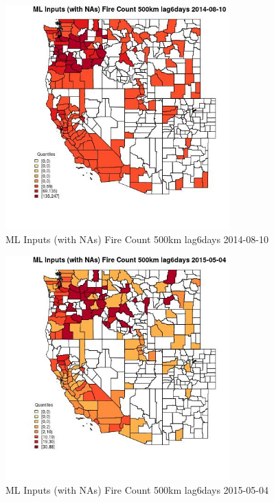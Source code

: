\begin{figure} 
\centering  
\includegraphics[width=0.77\textwidth]{Code_Outputs/Report_ML_input_PM25_Step4_part_e_de_duplicated_aves_compiled_2019-05-18wNAs_CountyFire_Count_500km_lag6daysMean2014-08-10_2014-08-10.jpg} 
\caption{\label{fig:Report_ML_input_PM25_Step4_part_e_de_duplicated_aves_compiled_2019-05-18wNAsCountyFire_Count_500km_lag6daysMean2014-08-10_2014-08-10}ML Inputs (with NAs) Fire Count 500km lag6days 2014-08-10} 
\end{figure} 
 

\begin{figure} 
\centering  
\includegraphics[width=0.77\textwidth]{Code_Outputs/Report_ML_input_PM25_Step4_part_e_de_duplicated_aves_compiled_2019-05-18wNAs_CountyFire_Count_500km_lag6daysMean2015-05-04_2015-05-04.jpg} 
\caption{\label{fig:Report_ML_input_PM25_Step4_part_e_de_duplicated_aves_compiled_2019-05-18wNAsCountyFire_Count_500km_lag6daysMean2015-05-04_2015-05-04}ML Inputs (with NAs) Fire Count 500km lag6days 2015-05-04} 
\end{figure} 
 

